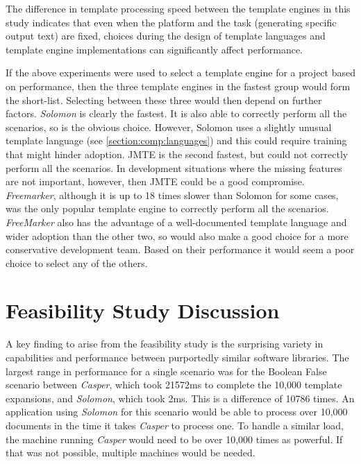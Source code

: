 The difference in template processing speed between the template engines in this study indicates that even when the platform and the task (generating specific output text) are fixed, choices during the design of \gls{template language}s and template engine implementations can significantly affect performance. 

\label{A135}
If the above experiments were used to select a \gls{template engine} for a project based on performance, then the three \gls{template engine}s in the fastest group would form the short-list. Selecting between these three would then depend on further factors. \emph{Solomon} is clearly the fastest. It is also able to correctly perform all the scenarios, so is the obvious choice. However, Solomon uses a slightly unusual \gls{template language} (see \autoref{section:comp:languages}) and this could require training that might hinder adoption. JMTE is the second fastest, but could not correctly perform all the scenarios. In development situations where the missing features are not important, however, then JMTE could be a good compromise. \emph{Freemarker}, although it is up to 18 times slower than Solomon for some cases, was the only popular \gls{template engine} to correctly perform all the scenarios. \emph{FreeMarker} also has the advantage of a well-documented \gls{template language} and wider adoption than the other two, so would also make a good choice for a more conservative development team. Based on their performance it would seem a poor choice to select any of the others.

\section{Feasibility Study Discussion}
\label{fs:discussion}

A key finding to arise from the feasibility study is the surprising variety in capabilities and performance between purportedly similar software libraries. The largest range in performance for a single scenario was for the Boolean False scenario between \emph{Casper}, which took 21572ms to complete the 10,000 template expansions, and \emph{Solomon}, which took 2ms. This is a difference of 10786 times. An application using \emph{Solomon} for this scenario would be able to process over 10,000 documents in the time it takes \emph{Casper} to process one. To handle a similar load, the machine running \emph{Casper} would need to be over 10,000 times as powerful. If that was not possible, multiple machines would be needed.

